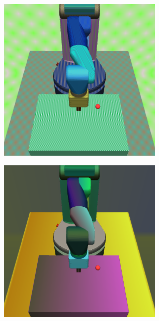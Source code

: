 \begin{figure}[h!]
  \centering
  \begin{subfigure}{0.24\columnwidth}
    \includegraphics[width=\linewidth]{figures/chapter6/rand_checker.png}
  \end{subfigure}
  \begin{subfigure}{0.24\columnwidth}
    \includegraphics[width=\linewidth]{figures/chapter6/rand_gradient.png}

\end{subfigure}
\end{figure}
